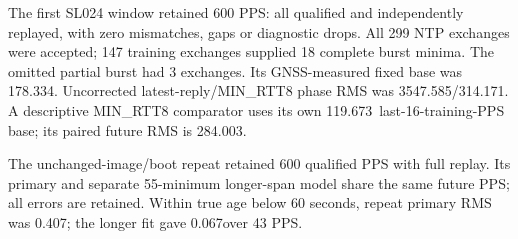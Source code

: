 The first SL024 window retained 600 PPS: all qualified and independently replayed, with zero mismatches, gaps or diagnostic drops. All 299 NTP exchanges were accepted; 147 training exchanges supplied 18 complete burst minima. The omitted partial burst had 3 exchanges. Its GNSS-measured fixed base was 178.334\us. Uncorrected latest-reply/MIN\_RTT8 phase RMS was 3547.585/314.171\us. A descriptive MIN\_RTT8 comparator uses its own 119.673\us\ last-16-training-PPS base; its paired future RMS is 284.003\us.
\par The unchanged-image/boot repeat retained 600 qualified PPS with full replay. Its primary and separate 55-minimum longer-span model share the same future PPS; all errors are retained. Within true age below 60 seconds, repeat primary RMS was 0.407\us; the longer fit gave 0.067\us over 43 PPS.
